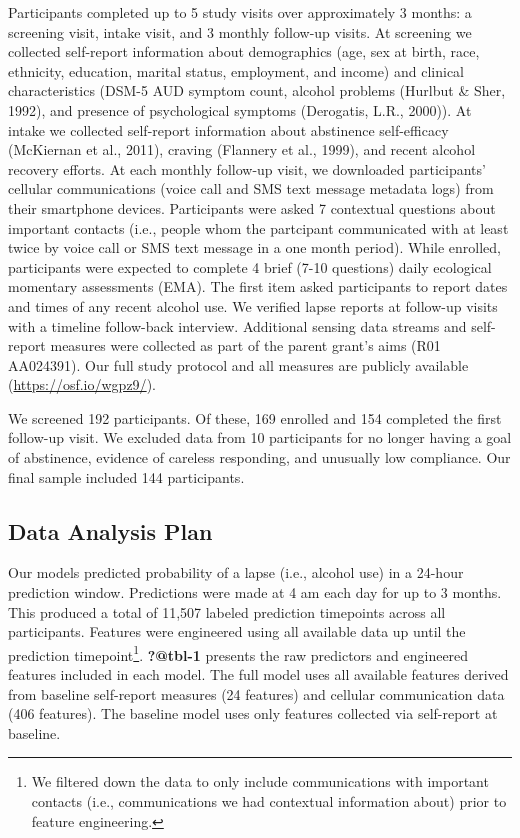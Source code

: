 \documentclass[
  letterpaper,
  DIV=11,
  numbers=noendperiod]{scrartcl}
\begin{document}
Participants completed up to 5 study visits over approximately 3 months:
a screening visit, intake visit, and 3 monthly follow-up visits. At
screening we collected self-report information about demographics (age,
sex at birth, race, ethnicity, education, marital status, employment,
and income) and clinical characteristics (DSM-5 AUD symptom count,
alcohol problems (Hurlbut \& Sher, 1992), and presence of psychological
symptoms (Derogatis, L.R., 2000)). At intake we collected self-report
information about abstinence self-efficacy (McKiernan et al., 2011),
craving (Flannery et al., 1999), and recent alcohol recovery efforts. At
each monthly follow-up visit, we downloaded participants' cellular
communications (voice call and SMS text message metadata logs) from
their smartphone devices. Participants were asked 7 contextual questions
about important contacts (i.e., people whom the partcipant communicated
with at least twice by voice call or SMS text message in a one month
period). While enrolled, participants were expected to complete 4 brief
(7-10 questions) daily ecological momentary assessments (EMA). The first
item asked participants to report dates and times of any recent alcohol
use. We verified lapse reports at follow-up visits with a timeline
follow-back interview. Additional sensing data streams and self-report
measures were collected as part of the parent grant's aims (R01
AA024391). Our full study protocol and all measures are publicly
available (\url{https://osf.io/wgpz9/}).

We screened 192 participants. Of these, 169 enrolled and 154 completed
the first follow-up visit. We excluded data from 10 participants for no
longer having a goal of abstinence, evidence of careless responding, and
unusually low compliance. Our final sample included 144 participants.

\subsection{Data Analysis Plan}\label{data-analysis-plan}

Our models predicted probability of a lapse (i.e., alcohol use) in a
24-hour prediction window. Predictions were made at 4 am each day for up
to 3 months. This produced a total of 11,507 labeled prediction
timepoints across all participants. Features were engineered using all
available data up until the prediction timepoint\footnote{We filtered
  down the data to only include communications with important contacts
  (i.e., communications we had contextual information about) prior to
  feature engineering.}. \textbf{?@tbl-1} presents the raw predictors
and engineered features included in each model. The full model uses all
available features derived from baseline self-report measures (24
features) and cellular communication data (406 features). The baseline
model uses only features collected via self-report at baseline.
\end{document}
